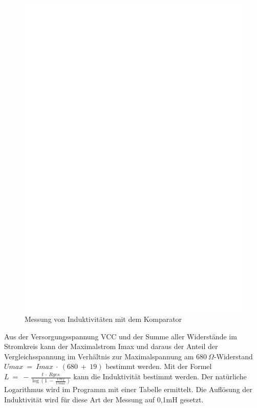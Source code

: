 \begin{figure}[H]
\centering
\includegraphics[]{../FIG/Inductance.eps}
\caption{Messung von Induktivitäten mit dem Komparator}
\label{fig:Inductance}
\end{figure}

Aus der Versorgungsspannung VCC und der Summe aller Widerstände im Stromkreis kann der Maximalstrom Imax und
daraus der Anteil der Vergleichsspannung im Verhältnis zur Maximalspannung am \(680~\Omega\)-Widerstand
\(Umax~=~Imax~\cdot~(680~+~19)\) bestimmt werden.
Mit der Formel \(L~=~-\frac{t~\cdot~Rges}{\log{(1~-~\frac{Uref}{Umax})}}\) kann die Induktivität bestimmt werden.
Der natürliche Logarithmus wird im Programm mit einer Tabelle ermittelt.
Die Auflösung der Induktivität wird für diese Art der Messung auf 0,1mH gesetzt.

